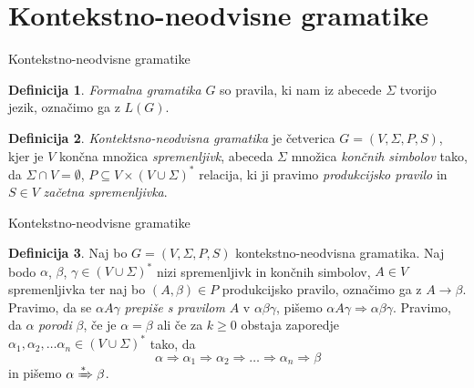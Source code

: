 \documentclass{beamer}
\theoremstyle{definition} %
\newtheorem{definicija}{Definicija}[section]
\theoremstyle{plain} %
\begin{document}
\section*{Kontekstno-neodvisne gramatike}

\begin{frame}{Kontekstno-neodvisne gramatike}
    
    \begin{definicija}

        \textit{Formalna gramatika} $ G $ so pravila, ki nam iz abecede $ \Sigma $ tvorijo jezik,
        označimo ga z $ L(G) $.
    
    \end{definicija}
    
    \pause

    \begin{definicija}
    
        \textit{Kontektsno-neodvisna gramatika} je četverica $ G = ( V, \Sigma, P, S ) $, kjer je
        $ V $ končna množica \textit{spremenljivk}, abeceda $ \Sigma $ množica \textit{končnih simbolov} tako,
        da $ \Sigma \cap V = \emptyset $, $ P \subseteq V \times ( V \cup \Sigma )^* $ relacija, ki ji
        pravimo \textit{produkcijsko pravilo} in $ S \in V $ \textit{začetna spremenljivka}.
    
    \end{definicija}

\end{frame}

\begin{frame}{Kontekstno-neodvisne gramatike}
    
    \begin{definicija}
    
        Naj bo $ G = ( V, \Sigma, P, S ) $ kontekstno-neodvisna gramatika. Naj bodo $ \alpha $,
        $ \beta $, $ \gamma \in ( V \cup \Sigma )^* $ nizi spremenljivk in končnih simbolov,
        $ A \in V $ spremenljivka ter naj bo $ ( A, \beta ) \in P $ produkcijsko pravilo,
        označimo ga z $ A \rightarrow \beta $. Pravimo, da se $ \alpha A \gamma $ 
        \textit{prepiše s pravilom} $ A $ v $ \alpha\beta\gamma $, pišemo $ \alpha A \gamma  \Rightarrow 
        \alpha\beta\gamma $. Pravimo, da $ \alpha $ \textit{porodi} $ \beta $, če je $ \alpha = \beta $ ali če
        za $ k \geq 0 $ obstaja zaporedje $ \alpha_1, \alpha_2, \ldots \alpha_n
        \in ( V \cup \Sigma )^* $ tako, da 
        \[
            \alpha \Rightarrow \alpha_1 \Rightarrow \alpha_2 \Rightarrow \ldots \Rightarrow \alpha_n
            \Rightarrow \beta
        \]
        in pišemo $ \alpha \xRightarrow{*} \beta $.
    
    \end{definicija}

\end{frame}
\end{document}
